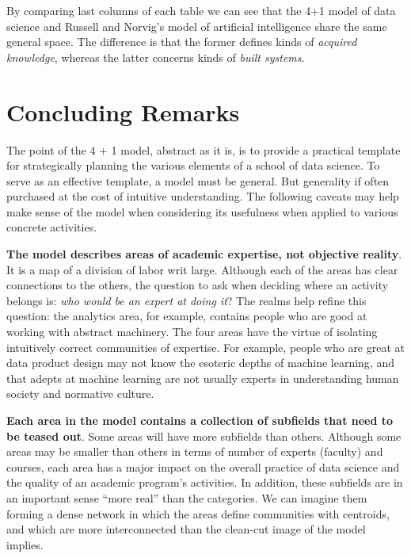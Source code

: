 \documentclass[
  letterpaper,
]{report}
\begin{document}
By comparing last columns of each table we can see that the 4+1 model of
data science and Russell and Norvig's model of artificial intelligence
share the same general space. The difference is that the former defines
kinds of \emph{acquired knowledge}, whereas the latter concerns kinds of
\emph{built systems}.

\hypertarget{concluding-remarks}{%
\chapter{Concluding Remarks}\label{concluding-remarks}}

The point of the 4 + 1 model, abstract as it is, is to provide a
practical template for strategically planning the various elements of a
school of data science. To serve as an effective template, a model must
be general. But generality if often purchased at the cost of intuitive
understanding. The following caveats may help make sense of the model
when considering its usefulness when applied to various concrete
activities.

\textbf{The model describes areas of academic expertise, not objective
reality}. It is a map of a division of labor writ large. Although each
of the areas has clear connections to the others, the question to ask
when deciding where an activity belongs is: \emph{who would be an expert
at doing it}? The realms help refine this question: the analytics area,
for example, contains people who are good at working with abstract
machinery. The four areas have the virtue of isolating intuitively
correct communities of expertise. For example, people who are great at
data product design may not know the esoteric depths of machine
learning, and that adepts at machine learning are not usually experts in
understanding human society and normative culture.

\textbf{Each area in the model contains a collection of subfields that
need to be teased out}. Some areas will have more subfields than others.
Although some areas may be smaller than others in terms of number of
experts (faculty) and courses, each area has a major impact on the
overall practice of data science and the quality of an academic
program's activities. In addition, these subfields are in an important
sense ``more real'' than the categories. We can imagine them forming a
dense network in which the areas define communities with centroids, and
which are more interconnected than the clean-cut image of the model
implies.
\end{document}
